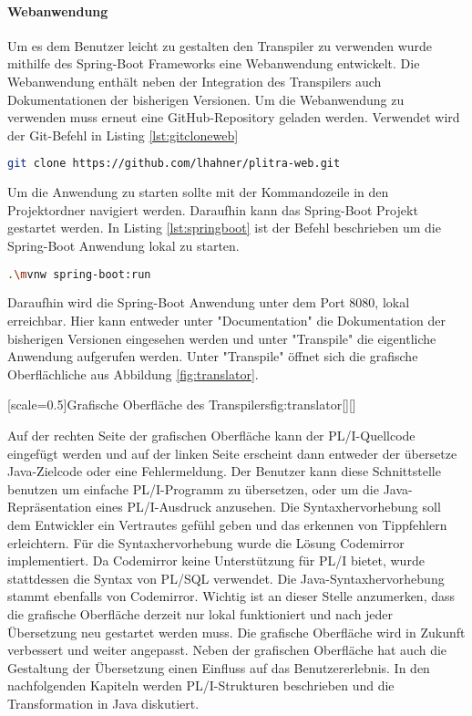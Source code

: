 \paragraph{Webanwendung}
Um es dem Benutzer leicht zu gestalten den Transpiler zu verwenden wurde mithilfe des Spring-Boot Frameworks eine Webanwendung entwickelt.
Die Webanwendung enthält neben der Integration des Transpilers auch Dokumentationen der bisherigen Versionen.
Um die Webanwendung zu verwenden muss erneut eine GitHub-Repository geladen werden. Verwendet wird der Git-Befehl in Listing
\ref{lst:gitcloneweb}

\begin{lstlisting}[language=bash, caption=Klonen des Repositories der Webschnittstelle, label={lst:gitcloneweb}]
	git clone https://github.com/lhahner/plitra-web.git
\end{lstlisting}

Um die Anwendung zu starten sollte mit der Kommandozeile in den Projektordner navigiert werden.
Daraufhin kann das Spring-Boot Projekt gestartet werden. In Listing \ref{lst:springboot} ist der Befehl beschrieben um die Spring-Boot Anwendung lokal zu starten.

\begin{lstlisting}[language=bash, caption=Build Spring-Boot Projekt, label={lst:springboot}]
	.\mvnw spring-boot:run
\end{lstlisting}

Daraufhin wird die Spring-Boot Anwendung unter dem Port 8080, lokal erreichbar.
Hier kann entweder unter "Documentation"  die Dokumentation der bisherigen Versionen eingesehen werden und unter "Transpile"
die eigentliche Anwendung aufgerufen werden.
Unter "Transpile"  öffnet sich die grafische Oberflächliche aus Abbildung \ref{fig:translator}.

[scale=0.5]{Grafische Oberfläche des Transpilers}{fig:translator}[][]

Auf der rechten Seite der grafischen Oberfläche kann der PL/I-Quellcode eingefügt werden und auf der linken Seite erscheint dann entweder der übersetze Java-Zielcode oder eine Fehlermeldung.
Der Benutzer kann diese Schnittstelle benutzen um einfache PL/I-Programm zu übersetzen, oder um die Java-Repräsentation eines PL/I-Ausdruck anzusehen.
Die Syntaxhervorhebung soll dem Entwickler ein Vertrautes gefühl geben und das erkennen von Tippfehlern erleichtern.
Für die Syntaxhervorhebung wurde die Lösung Codemirror implementiert. Da Codemirror keine Unterstützung für PL/I bietet, wurde stattdessen die Syntax von PL/SQL verwendet. Die Java-Syntaxhervorhebung stammt ebenfalls von Codemirror. Wichtig ist an dieser Stelle anzumerken, dass die grafische Oberfläche derzeit nur lokal funktioniert und nach jeder Übersetzung neu gestartet werden muss. Die grafische Oberfläche wird in Zukunft verbessert und weiter angepasst.
Neben der grafischen Oberfläche hat auch die Gestaltung der Übersetzung einen Einfluss auf das Benutzererlebnis.
In den nachfolgenden Kapiteln werden PL/I-Strukturen beschrieben und die Transformation in Java diskutiert.
\pagebreak

